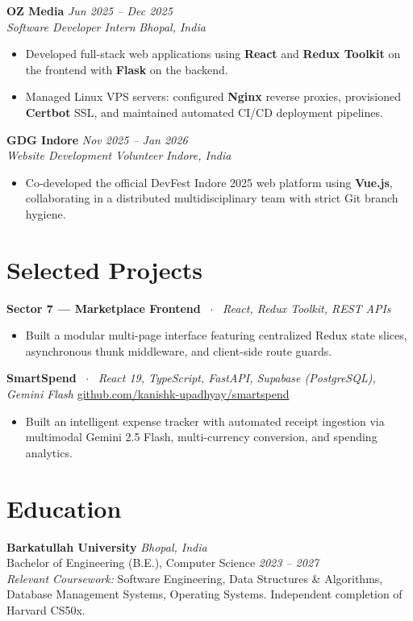 \documentclass[10pt,a4paper]{article}
\begin{document}
\textbf{OZ Media} \hfill \textit{Jun 2025 -- Dec 2025} \\
\textit{Software Developer Intern} \hfill \textit{Bhopal, India}
\begin{itemize}
    \item Developed full-stack web applications using \textbf{React} and \textbf{Redux Toolkit} on the frontend with \textbf{Flask} on the backend.
    \item Managed Linux VPS servers: configured \textbf{Nginx} reverse proxies, provisioned \textbf{Certbot} SSL, and maintained automated CI/CD deployment pipelines.
\end{itemize}

\textbf{GDG Indore} \hfill \textit{Nov 2025 -- Jan 2026} \\
\textit{Website Development Volunteer} \hfill \textit{Indore, India}
\begin{itemize}
    \item Co-developed the official DevFest Indore 2025 web platform using \textbf{Vue.js}, collaborating in a distributed multidisciplinary team with strict Git branch hygiene.
\end{itemize}

\section{Selected Projects}
\textbf{Sector 7 — Marketplace Frontend} \ $\cdot$ \ \textit{React, Redux Toolkit, REST APIs}
\begin{itemize}
    \item Built a modular multi-page interface featuring centralized Redux state slices, asynchronous thunk middleware, and client-side route guards.
\end{itemize}

\textbf{SmartSpend} \ $\cdot$ \ \textit{React 19, TypeScript, FastAPI, Supabase (PostgreSQL), Gemini Flash} \hfill \href{https://github.com/kanishk-upadhyay/smartspend}{github.com/kanishk-upadhyay/smartspend}
\begin{itemize}
    \item Built an intelligent expense tracker with automated receipt ingestion via multimodal Gemini 2.5 Flash, multi-currency conversion, and spending analytics.
\end{itemize}

\section{Education}
\textbf{Barkatullah University} \hfill \textit{Bhopal, India} \\
Bachelor of Engineering (B.E.), Computer Science \hfill \textit{2023 -- 2027} \\
\textit{Relevant Coursework:} Software Engineering, Data Structures \& Algorithms, Database Management Systems, Operating Systems. Independent completion of Harvard CS50x.
\end{document}
